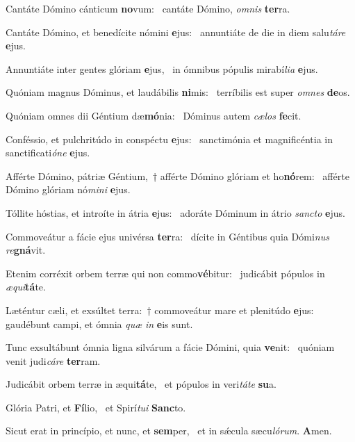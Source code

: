\item Cantáte Dómino cánticum \textbf{no}vum:~\psstar{} cantáte Dómino, \textit{omnis} \textbf{ter}ra.
\item Cantáte Dómino, et benedícite nómini \textbf{e}jus:~\psstar{} annuntiáte de die in diem salu\textit{táre} \textbf{e}jus.
\item Annuntiáte inter gentes glóriam \textbf{e}jus,~\psstar{} in ómnibus pópulis mirabí\textit{lia} \textbf{e}jus.
\item Quóniam magnus Dóminus, et laudábilis \textbf{ni}mis:~\psstar{} terríbilis est super \textit{omnes} \textbf{de}os.
\item Quóniam omnes dii Géntium dæ\textbf{mó}nia:~\psstar{} Dóminus autem \textit{cælos} \textbf{fe}cit.
\item Conféssio, et pulchritúdo in conspéctu \textbf{e}jus:~\psstar{} sanctimónia et magnificéntia in sanctificati\textit{óne} \textbf{e}jus.
\item Afférte Dómino, pátriæ Géntium,~† afférte Dómino glóriam et ho\textbf{nó}rem:~\psstar{} afférte Dómino glóriam nó\textit{mini} \textbf{e}jus.
\item Tóllite hóstias, et introíte in átria \textbf{e}jus:~\psstar{} adoráte Dóminum in átrio \textit{sancto} \textbf{e}jus.
\item Commoveátur a fácie ejus univérsa \textbf{ter}ra:~\psstar{} dícite in Géntibus quia Dómi\textit{nus} \textit{re}\textbf{gná}vit.
\item Etenim corréxit orbem terræ qui non commo\textbf{vé}bitur:~\psstar{} judicábit pópulos in \textit{æqui}\textbf{tá}te.
\item Læténtur cæli, et exsúltet terra:~† commoveátur mare et plenitúdo \textbf{e}jus:~\psstar{} gaudébunt campi, et ómnia \textit{quæ} \textit{in} \textbf{e}is sunt.
\item Tunc exsultábunt ómnia ligna silvárum a fácie Dómini, quia \textbf{ve}nit:~\psstar{} quóniam venit judi\textit{cáre} \textbf{ter}ram.
\item Judicábit orbem terræ in æqui\textbf{tá}te,~\psstar{} et pópulos in veri\textit{táte} \textbf{su}a.
\item Glória Patri, et \textbf{Fí}lio,~\psstar{} et Spirí\textit{tui} \textbf{Sanc}to.
\item Sicut erat in princípio, et nunc, et \textbf{sem}per,~\psstar{} et in sǽcula sæcu\textit{lórum}. \textbf{A}men.
